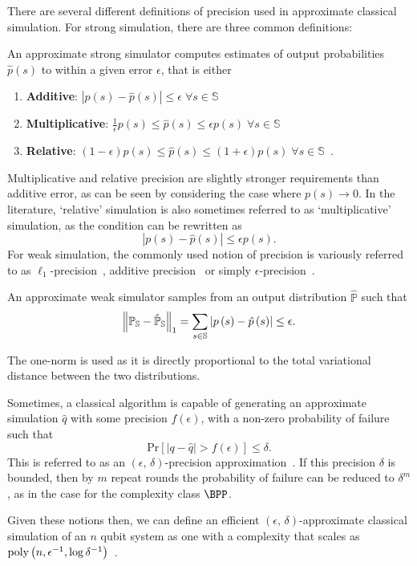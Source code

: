 There are several different definitions of precision used in approximate classical simulation. For strong simulation, there are three common definitions:
\begin{defn}\label{def:approximate_strong}
An approximate strong simulator computes estimates of output probabilities $\hat{p}\left(s\right)$ to within a given error $\epsilon$, that is either
\begin{enumerate}
    \item \textbf{Additive}: $\left|p\left(s\right)-\hat{p}\left(s\right)\right| \leq \epsilon\;\forall s\in\mathbb{S}$~\cite{Pashayan2017}
    \item \textbf{Multiplicative}: $\frac{1}{\epsilon}p\left(s\right)\leq \hat{p}\left(s\right) \leq \epsilon p\left(s\right)\;\forall s\in\mathbb{S}$~\cite{Hangleiter2017}
    \item \textbf{Relative}: $\left(1-\epsilon\right)p\left(s\right) \leq \hat{p}\left(s\right) \leq \left(1+\epsilon\right)p\left(s\right) \;\forall s\in\mathbb{S} $~\cite{Hangleiter2017,Bravyi2016}.
\end{enumerate}
\end{defn}
Multiplicative and relative precision are slightly stronger requirements than additive error, as can be seen by considering the case where $p\left(s\right)\rightarrow 0$. In the literature, `relative' simulation is also sometimes referred to as `multiplicative' simulation, as the condition can be rewritten as~\cite{Pashayan2017}
\[\left|p\left(s\right)-\hat{p}\left(s\right)\right| \leq \epsilon p\left(s\right).\]
For weak simulation, the commonly used notion of precision is variously referred to as $\ell_{1}$-precision~\cite{Bremner2011}, additive precision~\cite{Yoganathan2019} or simply $\epsilon$-precision~\cite{Pashayan2017}.
\begin{defn}\label{def:approximate_weak}
An approximate weak simulator samples from an output distribution $\hat{\mathbb{P}}$ such that
\[ \norm{\mathbb{P}_{\mathbb{S}}-\hat{\mathbb{P}}_{\mathbb{S}}}_{1} = \sum_{s\in \mathbb{S}} \left| p\left(s\right) - \hat{p}\left(s\right)\right| \leq \epsilon.\]
\end{defn}
The one-norm is used as it is directly proportional to the total variational distance between the two distributions.\par
Sometimes, a classical algorithm is capable of generating an approximate simulation $\hat{q}$ with some precision $f\left(\epsilon\right)$, with a non-zero probability of failure such that
\[\text{Pr}\left[\left|q-\hat{q}\right| > f\left(\epsilon\right)\right]\leq \delta.\]
This is referred to as an $\left(\epsilon,\,\delta\right)$-precision approximation~\cite{Pashayan2017}. If this precision $\delta$ is bounded, then by $m$ repeat rounds the probability of failure can be reduced to $\delta^{m}$, as in the case for the complexity class $\BPP$.\par
Given these notions then, we can define an efficient $\left(\epsilon,\,\delta\right)$-approximate classical simulation of an $n$ qubit system as one with a complexity that scales as $\text{poly} \left(n, \epsilon^{-1}, \log{\delta^{-1}}\right)$~\cite{Pashayan2017}.
